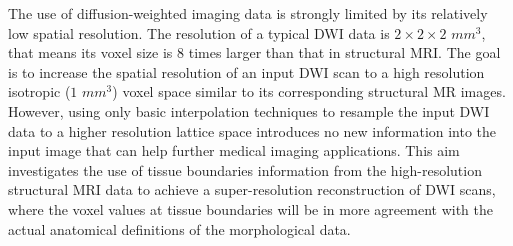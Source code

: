 The use of diffusion-weighted imaging data is strongly limited by its relatively low spatial resolution. The resolution of a typical DWI data is $2 \times 2 \times 2$  $mm^3$, that means its voxel size is $8$ times larger than that in structural MRI.
The goal is to increase the spatial resolution of an input DWI scan to a high resolution isotropic ($1$ $mm^3$) voxel space similar to its corresponding structural MR images. However, using only basic interpolation techniques to resample the input DWI data to a higher resolution lattice space introduces no new information into the input image that can help further medical imaging applications. This aim investigates the use of tissue boundaries information from the high-resolution structural MRI data to achieve a super-resolution reconstruction of DWI scans, where the voxel values at tissue boundaries will be in more agreement with the actual anatomical definitions of the morphological data.
\newline
